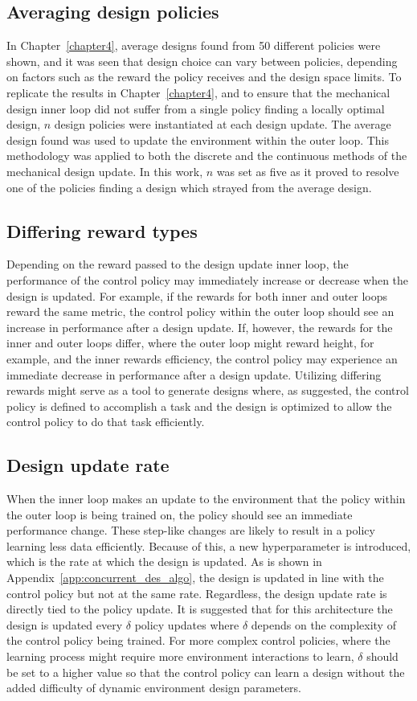 \subsection{Averaging design policies}
In Chapter~\ref{chapter4}, average designs found from 50 different policies were shown, and it was seen that design choice can vary between policies, depending on factors such as the reward the policy receives and the design space limits. To replicate the results in Chapter~\ref{chapter4}, and to ensure that the mechanical design inner loop did not suffer from a single policy finding a locally optimal design, $n$ design policies were instantiated at each design update. The average design found was used to update the environment within the outer loop. This methodology was applied to both the discrete and the continuous methods of the mechanical design update. In this work, $n$ was set as five as it proved to resolve one of the policies finding a design which strayed from the average design.

\subsection{Differing reward types}
Depending on the reward passed to the design update inner loop, the performance of the control policy may immediately increase or decrease when the design is updated. For example, if the rewards for both inner and outer loops reward the same metric, the control policy within the outer loop should see an increase in performance after a design update. If, however, the rewards for the inner and outer loops differ, where the outer loop might reward height, for example, and the inner rewards efficiency, the control policy may experience an immediate decrease in performance after a design update. Utilizing differing rewards might serve as a tool to generate designs where, as suggested, the control policy is defined to accomplish a task and the design is optimized to allow the control policy to do that task efficiently. 

\subsection{Design update rate}
When the inner loop makes an update to the environment that the policy within the outer loop is being trained on, the policy should see an immediate performance change. These step-like changes are likely to result in a policy learning less data efficiently. Because of this, a new hyperparameter is introduced, which is the rate at which the design is updated. As is shown in Appendix~\ref{app:concurrent_des_algo}, the design is updated in line with the control policy but not at the same rate. Regardless, the design update rate is directly tied to the policy update. It is suggested that for this architecture the design is updated every $\delta$ policy updates where $\delta$ depends on the complexity of the control policy being trained. For more complex control policies, where the learning process might require more environment interactions to learn, $\delta$ should be set to a higher value so that the control policy can learn a design without the added difficulty of dynamic environment design parameters.

